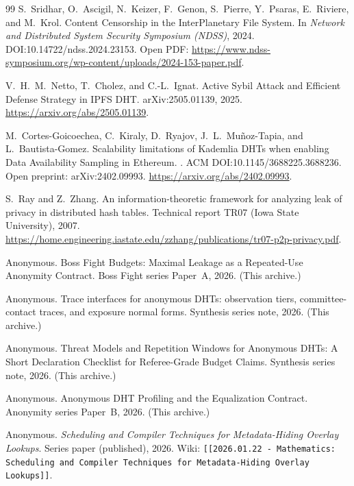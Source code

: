 \documentclass[11pt]{article}
\begin{document}
\begin{thebibliography}{99}
S.~Sridhar, O.~Ascigil, N.~Keizer, F.~Genon, S.~Pierre, Y.~Psaras, E.~Riviere, and M.~Krol.
\newblock Content Censorship in the InterPlanetary File System.
\newblock In \emph{Network and Distributed System Security Symposium (NDSS)}, 2024.
\newblock DOI:10.14722/ndss.2024.23153.
\newblock Open PDF: \url{https://www.ndss-symposium.org/wp-content/uploads/2024-153-paper.pdf}.

V.~H.~M.~Netto, T.~Cholez, and C.-L.~Ignat.
\newblock Active Sybil Attack and Efficient Defense Strategy in IPFS DHT.
\newblock arXiv:2505.01139, 2025. \url{https://arxiv.org/abs/2505.01139}.

M.~Cortes-Goicoechea, C.~Kiraly, D.~Ryajov, J.~L.~Mu\~noz-Tapia, and L.~Bautista-Gomez.
\newblock Scalability limitations of Kademlia DHTs when enabling Data Availability Sampling in Ethereum.
.
\newblock ACM DOI:10.1145/3688225.3688236. Open preprint: arXiv:2402.09993. \url{https://arxiv.org/abs/2402.09993}.

S.~Ray and Z.~Zhang.
\newblock An information-theoretic framework for analyzing leak of privacy in distributed hash tables.
\newblock Technical report TR07 (Iowa State University), 2007. \url{https://home.engineering.iastate.edu/zzhang/publications/tr07-p2p-privacy.pdf}.

Anonymous.
\newblock Boss Fight Budgets: Maximal Leakage as a Repeated-Use Anonymity Contract.
\newblock Boss Fight series Paper~A, 2026. (This archive.)


Anonymous.
\newblock Trace interfaces for anonymous DHTs: observation tiers, committee-contact traces, and exposure normal forms.
\newblock Synthesis series note, 2026. (This archive.)

Anonymous.
\newblock Threat Models and Repetition Windows for Anonymous DHTs: A Short Declaration Checklist for Referee-Grade Budget Claims.
\newblock Synthesis series note, 2026. (This archive.)

Anonymous.
\newblock Anonymous DHT Profiling and the Equalization Contract.
\newblock Anonymity series Paper~B, 2026. (This archive.)


Anonymous.
\newblock \emph{Scheduling and Compiler Techniques for Metadata-Hiding Overlay Lookups}.
\newblock Series paper (published), 2026.
\newblock Wiki: \texttt{[[2026.01.22 - Mathematics: Scheduling and Compiler Techniques for Metadata-Hiding Overlay Lookups]]}.



\end{thebibliography}
\end{document}
